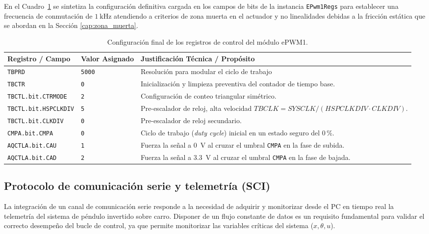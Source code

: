 \documentclass[11pt,fleqn]{book} %
\begin{document}
En el Cuadro~\ref{tab:config_epwm} se sintetiza la configuración definitiva cargada en los campos de bits de la instancia \texttt{EPwm1Regs} para establecer una frecuencia de conmutación de $1~\text{kHz}$ atendiendo a criterios de zona muerta en el actuador y no linealidades debidas a la fricción estática que se abordan en la Sección \ref{cap:zona_muerta}.

\begin{table}[htbp]
	\centering
	\caption{Configuración final de los registros de control del módulo ePWM1.}
	\label{tab:config_epwm}
	\renewcommand{\arraystretch}{1.3}
	\small
	\begin{tabularx}{\textwidth}{l l X}
		\hline
		\textbf{Registro / Campo} & \textbf{Valor Asignado} & \textbf{Justificación Técnica / Propósito} \\ \hline
		\texttt{TBPRD} & \texttt{5000} & Resolución para modular el ciclo de trabajo\\
		\texttt{TBCTR} & \texttt{0} & Inicialización y limpieza preventiva del contador de tiempo base. \\
		\texttt{TBCTL.bit.CTRMODE} & \texttt{2} & Configuración de conteo triangular simétrico. \\
		\texttt{TBCTL.bit.HSPCLKDIV} & \texttt{5} & Pre-escalador de reloj, alta velocidad $TBCLK = SYSCLK / (HSPCLKDIV \cdot CLKDIV)$. \\
		\texttt{TBCTL.bit.CLKDIV} & \texttt{0} & Pre-escalador de reloj secundario. \\
		\texttt{CMPA.bit.CMPA} & \texttt{0} & Ciclo de trabajo (\textit{duty cycle}) inicial en un estado seguro del 0\,\%. \\
		\texttt{AQCTLA.bit.CAU} & \texttt{1} & Fuerza la señal a 0~V al cruzar el umbral \texttt{CMPA} en la fase de subida. \\
		\texttt{AQCTLA.bit.CAD} & \texttt{2} & Fuerza la señal a 3.3~V al cruzar el umbral \texttt{CMPA} en la fase de bajada. \\ \hline
	\end{tabularx}
\end{table}
\FloatBarrier

\newpage
\subsection{Protocolo de comunicación serie y telemetría (SCI)}
\label{ssec:comunicacion_sci}

La integración de un canal de comunicación serie responde a la necesidad de adquirir y monitorizar desde el PC en tiempo real la telemetría del sistema de péndulo invertido sobre carro. Disponer de un flujo constante de datos es un requisito fundamental para validar el correcto desempeño del bucle de control, ya que permite monitorizar las variables críticas del sistema ($x, \theta, u$). 
\end{document}
